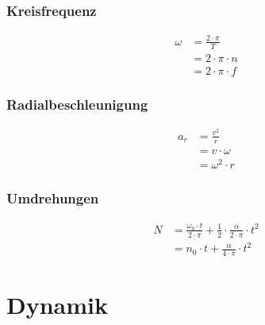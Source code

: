 \begin{multicols}{2}{}
\subsubsection*{Kreisfrequenz}
\begin{align*}
\omega&=\frac{2\cdot\pi}{T}\\
&=2\cdot\pi\cdot n \\
&=2\cdot\pi\cdot f
\end{align*}


\subsubsection*{Radialbeschleunigung}
\begin{align*}
a_r&=\frac{v^2}{r}\\
&=v\cdot\omega\\
&=\omega^2\cdot r
\end{align*}
\end{multicols}


\subsubsection*{Umdrehungen}
\begin{align*}
N&=\frac{\omega_0\cdot t}{2\cdot \pi}+\frac{1}{2}\cdot\frac{\alpha}{2\cdot \pi}\cdot t^2\\
&=n_0\cdot t+\frac{\alpha}{4\cdot\pi}\cdot t^2
\end{align*}


\newpage
\section{Dynamik}

